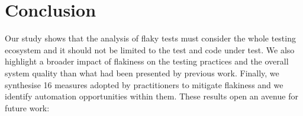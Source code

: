 \section{Conclusion}
\label{sec:survey-conclusion}

Our study shows that the analysis of flaky tests must consider the whole testing ecosystem and it should not be limited to the test and code under test.
We also highlight a broader impact of flakiness on the testing practices and the overall system quality than what had been presented by previous work. 
Finally, we synthesise 16 measures adopted by practitioners to mitigate flakiness and we identify automation opportunities within them. 
These results open an avenue for future work:

